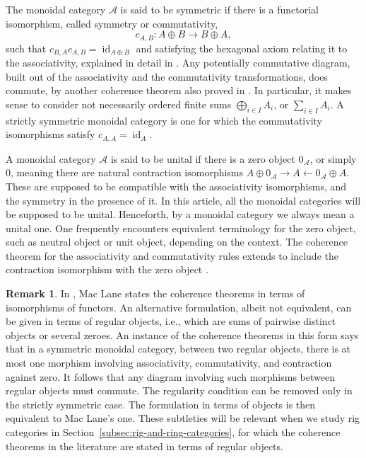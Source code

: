 \documentclass[11pt]{article}
\newcommand{\ie}{i.e.,\xspace}
\theoremstyle{plain}
\theoremstyle{definition}
\newtheorem{remark}[theorem]{Remark}
\newcommand{\Acal}{\mathcal A}
\DeclareMathOperator{\id}{id}
\begin{document}
The monoidal category $\Acal$ is said to be symmetric if there is a functorial isomorphism, called symmetry or commutativity,
\begin{displaymath}
c_{A,B}: A\oplus B \to B \oplus A,
\end{displaymath}
such that $c_{B,A}c_{A,B} = \id_{A\oplus B}$ and satisfying the hexagonal axiom relating it to the associativity, explained in detail in \cite[p.\,38]{MacLane}. Any potentially commutative diagram, built out of the associativity and the commutativity transformations, does commute, by another coherence theorem also proved in \cite[Th.\,4.2]{MacLane}. In particular, it makes sense to consider not necessarily ordered finite sums $\bigoplus_{i \in I} A_i$, or $\sum_{i\in I}A_{i}$. A strictly symmetric monoidal category is one for which the commutativity isomorphisms satisfy $c_{A,A}=\id_{A}$.

A monoidal category $\Acal$ is said to be unital if there is a zero object $0_{\Acal}$, or simply~$0$, meaning there are natural contraction isomorphisms $A\oplus 0_{\Acal} \rightarrow A \leftarrow 0_{\Acal} \oplus A$. These are supposed to be compatible with the associativity isomorphisms, and the symmetry in the presence of it. In this article, all the monoidal categories will be supposed to be unital. Henceforth, by a monoidal category we always mean a unital one. One frequently encounters equivalent terminology for the zero object, such as neutral object or unit object, depending on the context. The coherence theorem for the associativity and commutativity rules extends to include the contraction isomorphism with the zero object \cite[Th.\,5.1]{MacLane}.

\begin{remark}\label{rmk:Maclane-strict}
In \cite{MacLane}, Mac Lane states the coherence theorems in terms of isomorphisms of functors. An alternative formulation, albeit not equivalent, can be given in terms of regular objects, \ie which are sums of pairwise distinct objects or several zeroes. An instance of the coherence theorems in this form says that in a symmetric monoidal category, between two regular objects, there is at most one morphism involving associativity, commutativity, and contraction against zero. It follows that any diagram involving such morphisms between regular objects must commute. The regularity condition can be removed only in the strictly symmetric case. The formulation in terms of objects is then equivalent to Mac Lane's one. These subtleties will be relevant when we study rig categories in Section~\ref{subsec:rig-and-ring-categories}, for which the coherence theorems in the literature are stated in terms of regular objects.
\end{remark}
\end{document}
